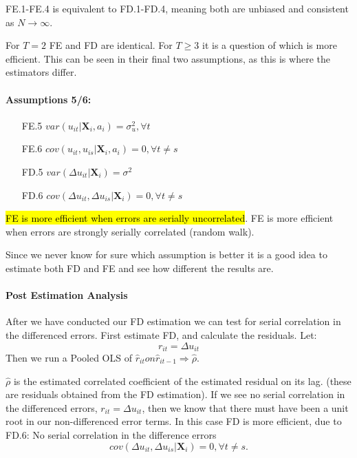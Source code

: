 \documentclass[11pt]{article}
\begin{document}
\begin{note}
    FE.1-FE.4 is equivalent to FD.1-FD.4, meaning both are unbiased and consistent as $N\rightarrow\infty$.
\end{note}

For $T=2$ FE and FD are identical. For $T\geq 3$ it is a question of which is more efficient. This can be seen in their final two assumptions, as this is where the estimators differ.

\newpage
\paragraph{Assumptions 5/6:} \mbox{}

\begin{itemize}
    \item [FE.5] $var(u_{it}|\boldsymbol{X}_i, a_i) = \sigma_u^2, \forall t$
    \item [FE.6] $cov(u_{it},u_{is}|\boldsymbol{X}_i,a_i)=0, \forall t \neq s$
    \item [FD.5] $var(\Delta u_{it}|\boldsymbol{X}_i) = \sigma^2$
    \item [FD.6] $cov(\Delta u_{it}, \Delta u_{is} | \boldsymbol{X}_i) = 0, \forall t \neq s$
\end{itemize}

\hl{FE is more efficient when errors are serially uncorrelated}. FE is more efficient when errors are strongly serially correlated (random walk).

Since we never know for sure which assumption is better it is a good idea to estimate both FD and FE and see how different the results are. 

\paragraph{Post Estimation Analysis} \mbox{}

After we have conducted our FD estimation we can test for serial correlation in the differenced errors. First estimate FD, and calculate the residuals. Let:
\[r_{it} = \Delta u_{it}\]
Then we run a Pooled OLS of $\hat{r}_{it} on \hat{r}_{it-1} \Rightarrow \hat{\rho}$.

$\hat{\rho}$ is the estimated correlated coefficient of the estimated residual on its lag. (these are residuals obtained from the FD estimation). If we see no serial correlation in the differenced errors, $r_{it} = \Delta u_{it}$, then we know that there must have been a unit root in our non-differenced error terms. In this case FD is more efficient, due to FD.6: No serial correlation in the difference errors
\[cov(\Delta u_{it}, \Delta u_{is} | \boldsymbol{X}_i) = 0, \forall t \neq s.\]
\end{document}
